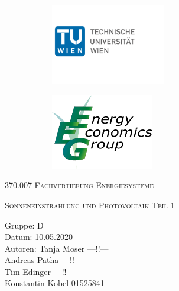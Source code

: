 \documentclass[a4paper,12pt]{article}
\begin{document}
	\begin{titlepage}
		\begin{figure}[h]
			\begin{subfigure}{1cm}
				\includegraphics[width=5cm]{img/TU_Logo}
			\end{subfigure}
			\hspace{10cm}
			\begin{subfigure}{6cm}
				\includegraphics[width=4.5cm]{img/EEG_logo}
			\end{subfigure}
		\end{figure}
		\centering
		\bigskip \bigskip \bigskip \bigskip \bigskip
		\scshape\LARGE 370.007 Fachvertiefung Energiesysteme\par
		\vspace{1cm}
		\scshape\large Sonneneinstrahlung und Photovoltaik Teil 1 \par
		\vspace{8cm}
		\raggedright
		\large Gruppe: D \\
		Datum: 10.05.2020 \\
		Autoren: Tanja Moser ---!!---\\
		\hspace{2.4cm} Andreas Patha ---!!---\\
		\hspace{2.4cm} Tim Edinger ---!!---\\
		\hspace{2.4cm} Konstantin Kobel 01525841\\
		\vfill
		\large \par
	\end{titlepage}
\end{document}
